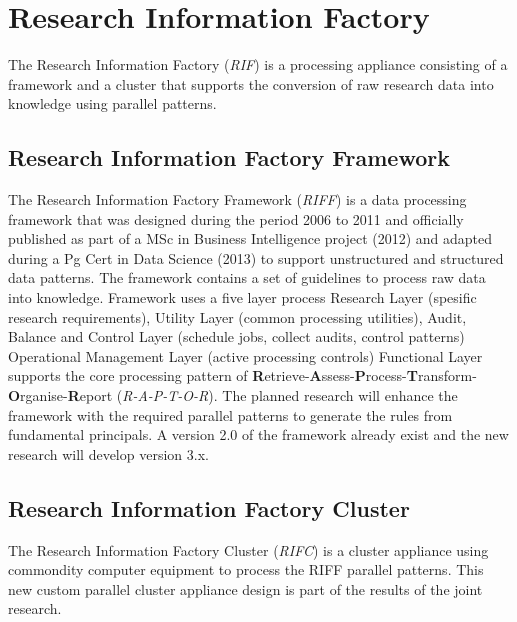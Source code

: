 \documentclass{acm_proc_article-sp}
\begin{document}
\section{Research Information Factory}
The Research Information Factory (\textit{RIF}) is a processing appliance consisting of a framework and a cluster that supports the conversion of raw research data into knowledge using parallel patterns. 
\subsection{Research Information Factory Framework}
The Research Information Factory Framework (\textit{RIFF}) is a data processing framework that was designed during the period 2006 to 2011 and officially published as part of a MSc in Business Intelligence project (2012) and adapted during a Pg Cert in Data Science (2013) to support unstructured and structured data patterns.  
The framework contains a set of guidelines to process raw data into knowledge. 
Framework uses a five layer process Research Layer (spesific research requirements), Utility Layer (common processing utilities), Audit, Balance and Control Layer (schedule jobs, collect audits, control patterns)
Operational Management Layer (active processing controls) Functional Layer supports the core processing pattern of \textbf{R}etrieve-\textbf{A}ssess-\textbf{P}rocess-\textbf{T}ransform-\textbf{O}rganise-\textbf{R}eport (\textit{R-A-P-T-O-R}). The planned research will enhance the framework with the required parallel patterns to generate the rules from fundamental principals. A version 2.0 of the framework already exist and the new research will develop version 3.x.
\subsection{Research Information Factory Cluster}
The Research Information Factory Cluster (\textit{RIFC}) is a cluster appliance using commondity computer equipment to process the RIFF parallel patterns. This new custom parallel cluster appliance design is part of the results of the joint research.
\end{document}
